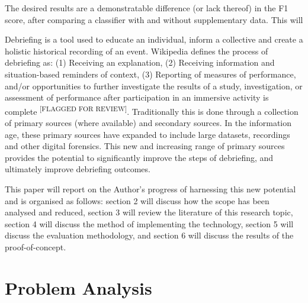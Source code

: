 \documentclass{UoNMCHA}
\newcommand{\flagforreview}{\textsuperscript{\color{red} [FLAGGED FOR REVIEW]}}
\numberwithin{equation}{section}
\begin{document}
The desired results are a demonstratable difference (or lack thereof) in the F1 score, after comparing a classifier with and without supplementary data.
This will 

Debriefing is a tool used to educate an individual, inform a collective and create a holistic historical recording of an event. Wikipedia defines the process of debriefing as: (1) Receiving an explanation, (2) Receiving information and situation-based reminders of context, (3) Reporting of measures of performance, and/or opportunities to further investigate the results of a study, investigation, or assessment of performance after participation in an immersive activity is complete \cite{Wiki}\flagforreview. Traditionally this is done through a collection of primary sources (where available) and secondary sources. In the information age, these primary sources have expanded to include large datasets, recordings and other digital forensics. This new and increasing range of primary sources provides the potential to significantly improve the steps of debriefing, and ultimately improve debriefing outcomes.

This paper will report on the Author’s progress of harnessing this new potential and is organised as follows: section 2 will discuss how the scope has been analysed and reduced, section 3 will review the literature of this research topic, section 4 will discuss the method of implementing the technology, section 5 will discuss the evaluation methodology, and section 6 will discuss the results of the proof-of-concept.

%

\section{Problem Analysis}\label{sec:ProblemAnalysis}
\end{document}
